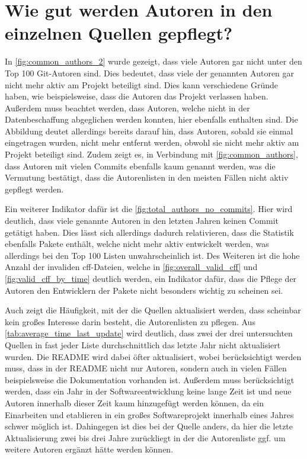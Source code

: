 \section{Wie gut werden Autoren in den einzelnen Quellen gepflegt?}
\label{sec:autoren_pflege_diskussion}
In \autoref{fig:common_authors_2} wurde gezeigt, dass viele Autoren gar nicht unter den Top 100 Git-Autoren sind.
Dies bedeutet, dass viele der genannten Autoren gar nicht mehr aktiv am Projekt beteiligt sind.
Dies kann verschiedene Gründe haben, wie beispielsweise, dass die Autoren das Projekt verlassen haben.
Außerdem muss beachtet werden, dass Autoren, welche nicht in der Datenbeschaffung abgeglichen werden konnten, hier ebenfalls enthalten sind.
Die Abbildung deutet allerdings bereits darauf hin, dass Autoren, sobald sie einmal eingetragen wurden, nicht mehr entfernt werden, obwohl sie nicht mehr aktiv am Projekt beteiligt sind.
Zudem zeigt es, in Verbindung mit \autoref{fig:common_authors}, dass Autoren mit vielen Commits ebenfalls kaum genannt werden, was die Vermutung bestätigt, dass die Autorenlisten in den meisten Fällen nicht aktiv gepflegt werden.

Ein weiterer Indikator dafür ist die \autoref{fig:total_authors_no_commits}.
Hier wird deutlich, dass viele genannte Autoren in den letzten Jahren keinen Commit getätigt haben.
Dies lässt sich allerdings dadurch relativieren, dass die Statistik ebenfalls Pakete enthält, welche nicht mehr aktiv entwickelt werden, was allerdings bei den Top 100 Listen unwahrscheinlich ist.
Des Weiteren ist die hohe Anzahl der invaliden \gls{cff}-Dateien, welche in \autoref{fig:overall_valid_cff} und \autoref{fig:valid_cff_by_time} deutlich werden, ein Indikator dafür, dass die Pflege der Autoren den Entwicklern der Pakete nicht besonders wichtig zu scheinen sei.

Auch zeigt die Häufigkeit, mit der die Quellen aktualisiert werden, dass scheinbar kein großes Interesse darin besteht, die Autorenlisten zu pflegen.
Aus \autoref{tab:average_time_last_update} wird deutlich, dass zwei der drei untersuchten Quellen in fast jeder Liste durchschnittlich das letzte Jahr nicht aktualisiert wurden.
Die README wird dabei öfter aktualisiert, wobei berücksichtigt werden muss, dass in der README nicht nur Autoren, sondern auch in vielen Fällen beispielsweise die Dokumentation vorhanden ist.
Außerdem muss berücksichtigt werden, dass ein Jahr in der Softwareentwicklung keine lange Zeit ist und neue Autoren innerhalb dieser Zeit kaum hinzugefügt werden können, da ein Einarbeiten und etablieren in ein großes Softwareprojekt innerhalb eines Jahres schwer möglich ist.
Dahingegen ist dies bei der  Quelle anders, da hier die letzte Aktualisierung zwei bis drei Jahre zurückliegt in der die Autorenliste ggf. um weitere Autoren ergänzt hätte werden können.

